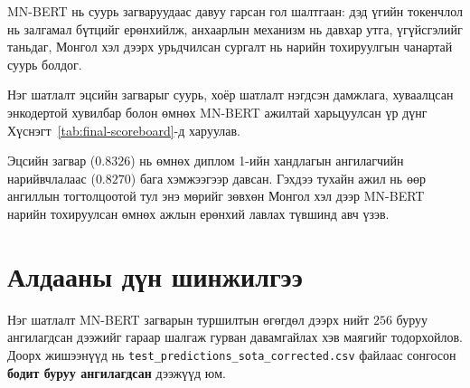 MN-BERT нь суурь загваруудаас давуу гарсан гол шалтгаан: дэд үгийн токенчлол нь
залгамал бүтцийг ерөнхийлж, анхаарлын механизм нь давхар утга, үгүйсгэлийг
таньдаг, Монгол хэл дээрх урьдчилсан сургалт нь нарийн тохируулгын чанартай
суурь болдог.

Нэг шатлалт эцсийн загварыг суурь, хоёр шатлалт нэгдсэн дамжлага, хуваалцсан
энкодертой хувилбар болон өмнөх MN-BERT ажилтай харьцуулсан үр дүнг
Хүснэгт~\ref{tab:final-scoreboard}-д харуулав.

\begin{table}[H]
\centering
\caption{Эцсийн үр дүнгүүдийн харьцуулалт}
\label{tab:final-scoreboard}
\end{table}

Эцсийн загвар ($0.8326$) нь өмнөх диплом 1-ийн хандлагын ангилагчийн
нарийвчлалаас ($0.8270$) бага хэмжээгээр давсан. Гэхдээ тухайн ажил нь өөр
ангиллын тогтолцоотой тул энэ мөрийг зөвхөн Монгол хэл дээр MN-BERT нарийн
тохируулсан өмнөх ажлын ерөнхий лавлах түвшинд авч үзэв.

\section{Алдааны дүн шинжилгээ}
\label{sec:error-analysis}

Нэг шатлалт MN-BERT загварын туршилтын өгөгдөл дээрх нийт $256$ буруу ангилагдсан дээжийг гараар шалгаж
гурван давамгайлах хэв маягийг тодорхойлов.
Доорх жишээнүүд нь \texttt{test\_predictions\_sota\_corrected.csv} файлаас
сонгосон \textbf{бодит буруу ангилагдсан} дээжүүд юм.

